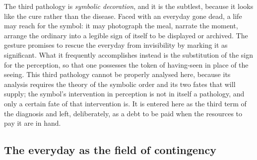 The third pathology is \emph{symbolic decoration}, and it is the subtlest, because it looks like the cure rather than the disease. Faced with an everyday gone dead, a life may reach for the symbol: it may photograph the meal, narrate the moment, arrange the ordinary into a legible sign of itself to be displayed or archived. The gesture promises to rescue the everyday from invisibility by marking it as significant. What it frequently accomplishes instead is the substitution of the sign for the perception, so that one possesses the token of having-seen in place of the seeing. This third pathology cannot be properly analysed here, because its analysis requires the theory of the symbolic order and its two fates that  will supply; the symbol's intervention in perception is not in itself a pathology, and only a certain fate of that intervention is. It is entered here as the third term of the diagnosis and left, deliberately, as a debt to be paid when the resources to pay it are in hand.

\subsection{The everyday as the field of contingency}
\label{p23:sub:diag-contingency}

